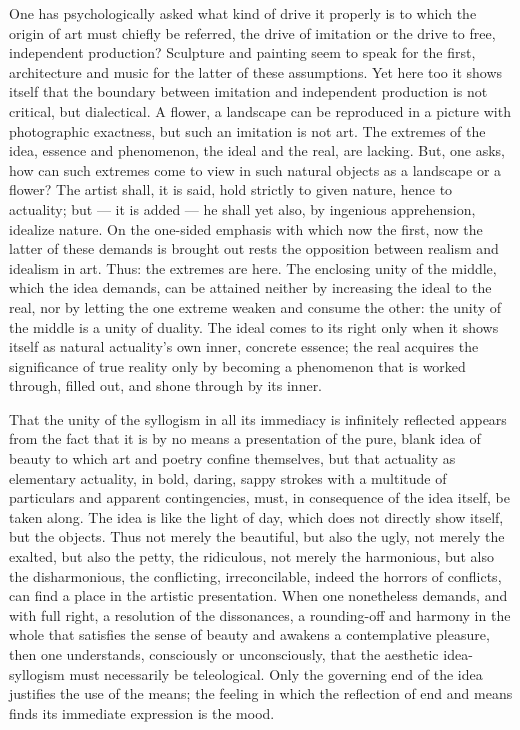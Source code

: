 \documentclass[12pt]{book}
\begin{document}
One has psychologically asked what kind of drive it properly is to which the origin of art must
chiefly be referred, the drive of imitation or the drive to free, independent production?
Sculpture and painting seem to speak for the first, architecture and music for the latter of
these assumptions. Yet here too it shows itself that the boundary between imitation and
independent production is not critical, but dialectical. A flower, a landscape can be reproduced
in a picture with photographic exactness, but such an imitation is not art. The extremes of the
idea, essence and phenomenon, the ideal and the real, are lacking. But, one asks, how can such
extremes come to view in such natural objects as a landscape or a flower? The artist shall, it is
said, hold strictly to given nature, hence to actuality; but --- it is added --- he shall yet
also, by ingenious apprehension, idealize nature. On the one-sided emphasis with which now the
first, now the latter of these demands is brought out rests the opposition between realism and
idealism in art. Thus: the extremes are here. The enclosing unity of the middle, which the idea
demands, can be attained neither by increasing the ideal to the real, nor by letting the one
extreme weaken and consume the other: the unity of the middle is a unity of duality. The ideal
comes to its right only when it shows itself as natural actuality's own inner, concrete essence;
the real acquires the significance of true reality only by becoming a phenomenon that is worked
through, filled out, and shone through by its inner.

That the unity of the syllogism in all its immediacy is infinitely reflected appears from the
fact that it is by no means a presentation of the pure, blank idea of beauty to which art and
poetry confine themselves, but that actuality as elementary actuality, in bold, daring, sappy
strokes with a multitude of particulars and apparent contingencies, must, in consequence of the
idea itself, be taken along. The idea is like the light of day, which does not directly show
itself, but the objects. Thus not merely the beautiful, but also the ugly, not merely the
exalted, but also the petty, the ridiculous, not merely the harmonious, but also the
disharmonious, the conflicting, irreconcilable, indeed the horrors of conflicts, can find a
place in the artistic presentation. When one nonetheless demands, and with full right, a
resolution of the dissonances, a rounding-off and harmony in the whole that satisfies the sense
of beauty and awakens a contemplative pleasure, then one understands, consciously or
unconsciously, that the aesthetic idea-syllogism must necessarily be teleological. Only the
governing end of the idea justifies the use of the means; the feeling in which the reflection of
end and means finds its immediate expression is the mood.
\end{document}
